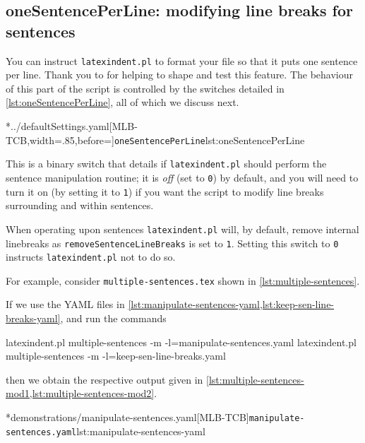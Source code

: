 \subsection{oneSentencePerLine: modifying line breaks for sentences}\label{sec:onesentenceperline}
	You can instruct \texttt{latexindent.pl} to
	format%
	 your file so that
	it puts one sentence per line. Thank you to \cite{mlep} for helping to
	shape and test this feature. The behaviour of this part of the script is controlled by
	the switches detailed in \cref{lst:oneSentencePerLine}, all of which we discuss next.

	\cmhlistingsfromfile[style=oneSentencePerLine]*{../defaultSettings.yaml}[MLB-TCB,width=.85\linewidth,before=\centering]{\texttt{oneSentencePerLine}}{lst:oneSentencePerLine}

	This is a binary switch that details if \texttt{latexindent.pl} should perform the
	sentence manipulation routine; it is \emph{off} (set to \texttt{0}) by default, and you will
	need to turn it on (by setting it to \texttt{1}) if you want the script
	to modify line breaks surrounding and within sentences.

	When operating upon sentences \texttt{latexindent.pl} will, by default, remove
	internal linebreaks as \texttt{removeSentenceLineBreaks} is set to \texttt{1}.
	Setting this switch to \texttt{0} instructs \texttt{latexindent.pl}
	not to do so.

	For example, consider \texttt{multiple-sentences.tex} shown in \cref{lst:multiple-sentences}.


	If we use the YAML files in \cref{lst:manipulate-sentences-yaml,lst:keep-sen-line-breaks-yaml}, and run the commands
	\begin{widepage}
		\begin{commandshell}
latexindent.pl multiple-sentences -m -l=manipulate-sentences.yaml
latexindent.pl multiple-sentences -m -l=keep-sen-line-breaks.yaml
	\end{commandshell}
	\end{widepage}
	then we obtain the respective output given in \cref{lst:multiple-sentences-mod1,lst:multiple-sentences-mod2}.

	\begin{minipage}{.5\linewidth}
	\end{minipage}
	\hfill
	\begin{minipage}{.5\linewidth}
		\cmhlistingsfromfile[style=yaml-LST]*{demonstrations/manipulate-sentences.yaml}[MLB-TCB]{\texttt{manipulate-sentences.yaml}}{lst:manipulate-sentences-yaml}
	\end{minipage}

